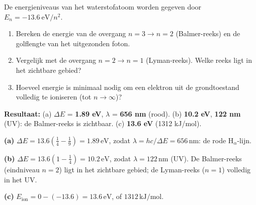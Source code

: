 \begin{oefening}
De energieniveaus van het waterstofatoom worden gegeven door \(E_n = -13.6~\mathrm{eV}/n^2\).

\begin{enumerate}
\item[(a)]
  Bereken de energie van de overgang \(n=3 \to n=2\) (Balmer-reeks) en de golflengte van het uitgezonden foton.
\item[(b)]
  Vergelijk met de overgang \(n=2 \to n=1\) (Lyman-reeks). Welke reeks ligt in het zichtbare gebied?
\item[(c)]
  Hoeveel energie is minimaal nodig om een elektron uit de grondtoestand volledig te ioniseren (tot \(n \to \infty\))?
\end{enumerate}
\end{oefening}
\begin{oplossing}
\textbf{Resultaat:} (a) \(\Delta E\) = \textbf{1.89 eV}, \(\lambda\) = \textbf{656 nm} (rood). (b) \textbf{10.2 eV}, \textbf{122 nm} (UV): de Balmer-reeks is zichtbaar. (c) \textbf{13.6 eV} (1312 kJ/mol).

\textbf{(a)} \(\Delta E = 13.6\left(\frac{1}{4} - \frac{1}{9}\right) = 1.89\,\mathrm{eV}\), zodat \(\lambda = hc/\Delta E = 656\,\mathrm{nm}\): de rode H\(_\alpha\)-lijn.

\textbf{(b)} \(\Delta E = 13.6\left(1 - \frac{1}{4}\right) = 10.2\,\mathrm{eV}\), zodat \(\lambda = 122\,\mathrm{nm}\) (UV). De Balmer-reeks (eindniveau \(n = 2\)) ligt in het zichtbare gebied; de Lyman-reeks (\(n = 1\)) volledig in het UV.

\textbf{(c)} \(E_{\text{ion}} = 0 - (-13.6) = 13.6\,\mathrm{eV}\), of \(1312\,\mathrm{kJ/mol}\).
\end{oplossing}


